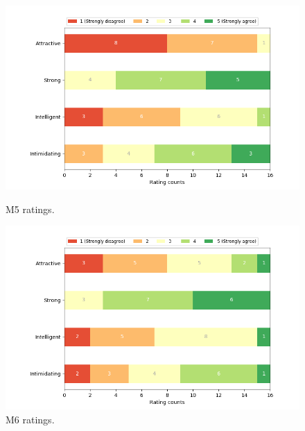 \begin{figure}[H]
  \includegraphics[width=\linewidth]{Survey/MRatings/avatar_m5.png}
  \caption{M5 ratings.}
\endminipage\hfill
{}
  \includegraphics[width=\linewidth]{Survey/MRatings/avatar_m6.png}
  \caption{M6 ratings.}
\endminipage\hfill
\end{figure}
